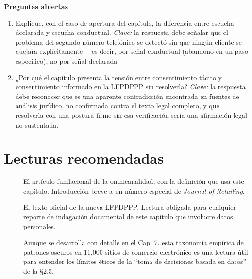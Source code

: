 \textbf{Preguntas abiertas}

\begin{enumerate}
  \item Explique, con el caso de apertura del capítulo, la diferencia entre
  escucha declarada y escucha conductual. \textit{Clave:} la respuesta debe
  señalar que el problema del segundo número telefónico se detectó sin que
  ningún cliente se quejara explícitamente —es decir, por señal conductual
  (abandono en un paso específico), no por señal declarada.
  \item ¿Por qué el capítulo presenta la tensión entre consentimiento tácito
  y consentimiento informado en la LFPDPPP sin resolverla?
  \textit{Clave:} la respuesta debe reconocer que es una aparente
  contradicción encontrada en fuentes de análisis jurídico, no confirmada
  contra el texto legal completo, y que resolverla con una postura firme sin
  esa verificación sería una afirmación legal no sustentada.
\end{enumerate}

\section{Lecturas recomendadas}

\begin{description}
  \item[\textcite{verhoef2015}] El artículo fundacional de la omnicanalidad,
  con la definición que usa este capítulo. Introducción breve a un número
  especial de \textit{Journal of Retailing}.
  \item[\textcite{dof_lfpdppp2025}] El texto oficial de la nueva LFPDPPP.
  Lectura obligada para cualquier reporte de indagación documental de este
  capítulo que involucre datos personales.
  \item[\textcite{mathur2019}] Aunque se desarrolla con detalle en el Cap. 7,
  esta taxonomía empírica de patrones oscuros en 11{,}000 sitios de comercio
  electrónico es una lectura útil para entender los límites éticos de la
  \enquote{toma de decisiones basada en datos} de la §2.5.
\end{description}

